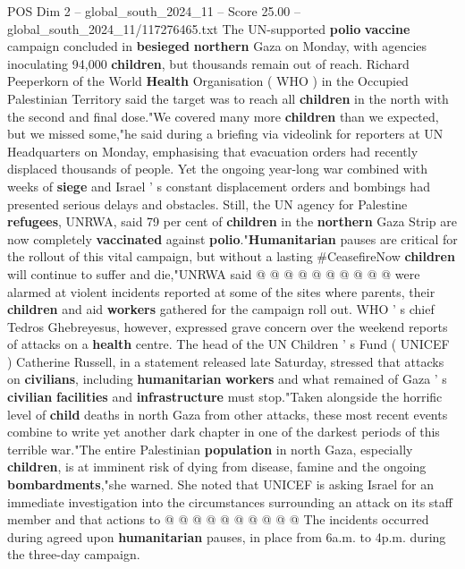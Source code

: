 \begin{textsample}{POS Dim 2 – global\_south\_2024\_11 – Score 25.00 – global\_south\_2024\_11/117276465.txt}  \label{ex:f2_pos_246}
The UN-supported \textbf{polio} \textbf{vaccine} campaign concluded in \textbf{besieged} \textbf{northern} Gaza on Monday, with agencies inoculating 94,000 \textbf{children}, but thousands remain out of reach.
Richard Peeperkorn of the World \textbf{Health} Organisation ( WHO ) in the Occupied Palestinian Territory said the target was to reach all \textbf{children} in the north with the second and final dose."We covered many more \textbf{children} than we expected, but we missed some,"he said during a briefing via videolink for reporters at UN Headquarters on Monday, emphasising that evacuation orders had recently displaced thousands of people.
Yet the ongoing year-long war combined with weeks of \textbf{siege} and Israel ' s constant displacement orders and bombings had presented serious delays and obstacles.
Still, the UN agency for Palestine \textbf{refugees}, UNRWA, said 79 per cent of \textbf{children} in the \textbf{northern} Gaza Strip are now completely \textbf{vaccinated} against \textbf{polio}."\textbf{Humanitarian} pauses are critical for the rollout of this vital campaign, but without a lasting \#CeasefireNow \textbf{children} will continue to suffer and die,"UNRWA said @ @ @ @ @ @ @ @ @ @ were alarmed at violent incidents reported at some of the sites where parents, their \textbf{children} and aid \textbf{workers} gathered for the campaign roll out.
WHO ' s chief Tedros Ghebreyesus, however, expressed grave concern over the weekend reports of attacks on a \textbf{health} centre.
The head of the UN Children ' s Fund ( UNICEF ) Catherine Russell, in a statement released late Saturday, stressed that attacks on \textbf{civilians}, including \textbf{humanitarian} \textbf{workers} and what remained of Gaza ' s \textbf{civilian} \textbf{facilities} and \textbf{infrastructure} must stop."Taken alongside the horrific level of \textbf{child} deaths in north Gaza from other attacks, these most recent events combine to write yet another dark chapter in one of the darkest periods of this terrible war."The entire Palestinian \textbf{population} in north Gaza, especially \textbf{children}, is at imminent risk of dying from disease, famine and the ongoing \textbf{bombardments},"she warned.
She noted that UNICEF is asking Israel for an immediate investigation into the circumstances surrounding an attack on its staff member and that actions to @ @ @ @ @ @ @ @ @ @ The incidents occurred during agreed upon \textbf{humanitarian} pauses, in place from 6a.m. to 4p.m. during the three-day campaign.

\end{textsample}

